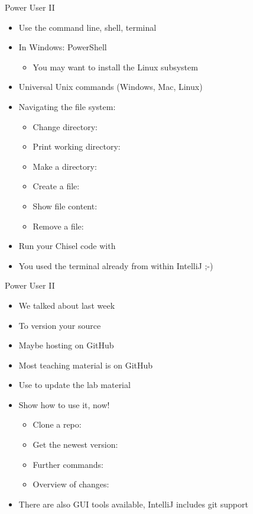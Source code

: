 \begin{frame}[fragile]{Power User II}
\begin{itemize}
\item Use the command line, shell, terminal
\item In Windows: PowerShell
\begin{itemize}
\item You may want to install the Linux subsystem
\end{itemize}
\item Universal Unix commands (Windows, Mac, Linux)
\item Navigating the file system:
\begin{itemize}
\item Change directory: 
\item Print working directory: 
\item Make a directory: 
\item Create a file: 
\item Show file content: 
\item Remove a file: 
\end{itemize}
\item Run your Chisel code with 
\item You used the terminal already from within IntelliJ ;-)
\end{itemize}
\end{frame}

\begin{frame}[fragile]{Power User II}
\begin{itemize}
\item We talked about  last week
\item To version your source
\item Maybe hosting on GitHub
\item Most teaching material is on GitHub
\item Use  to update the lab material
\item Show how to use it, now!
\begin{itemize}
\item Clone a repo: 
\item Get the newest version: 
\item Further commands: 
\item Overview of changes: 
\end{itemize}
\item There are also GUI tools available, IntelliJ includes git support
\end{itemize}
\end{frame}




